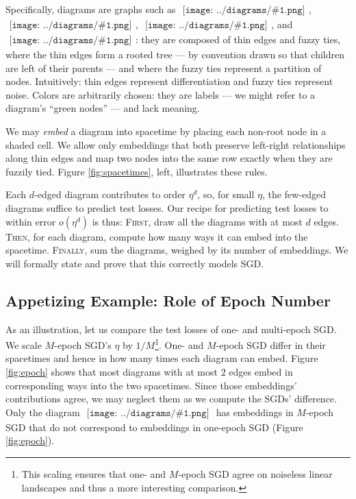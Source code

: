 \documentclass{article}
\theoremstyle{plain}
\theoremstyle{definition}
\newcommand{\sdia}[1]{\begin{gathered}\texttt{[image: ../diagrams/\#1.png]}\end{gathered}}
\begin{document}
            Specifically, diagrams are graphs such as $\sdia{(0-1)(01)}$,
            $\sdia{(01-2)(02-12)}$, $\sdia{(01-2)(01-12)}$, and
            $\sdia{(0-123)(02-12-23)}$: they are composed of thin edges and
            fuzzy ties, where the thin edges form a rooted tree --- by
            convention drawn so that children are left of their parents --- and
            where the fuzzy ties represent a partition of nodes.
            Intuitively: thin edges represent differentiation and fuzzy
            ties represent noise.
            {\color{moor}
            Colors} are arbitrarily chosen: they are labels --- we might refer
            to a diagram's ``green nodes'' --- and lack meaning.

            We may \emph{embed} a diagram into spacetime by placing each
            non-root node in a shaded cell.  We allow only embeddings that both
            preserve left-right relationships along thin edges and map two
            nodes into the same row exactly when they are fuzzily tied.  Figure
            \ref{fig:spacetimes}, left, illustrates these rules.

            Each $d$-edged diagram contributes to order $\eta^d$, so, for small
            $\eta$, the few-edged diagrams suffice to predict test losses.  Our
            recipe for predicting test losses to within error $o(\eta^d)$ is
            thus: \textsc{First}, draw all the diagrams with at most $d$ edges.
            \textsc{Then}, for each diagram, compute how many ways it can
            embed into the spacetime.  \textsc{Finally}, sum the diagrams,
            weighed by its number of embeddings.  We will formally state and
            prove that this correctly models SGD. 


    \subsection{Appetizing Example: Role of Epoch Number}
            As an illustration, let us compare the test losses of one- and
            multi-epoch SGD.  We scale $M$-epoch SGD's $\eta$ by
            $1/M$\footnote{
                This scaling ensures that one- and $M$-epoch SGD
                agree on noiseless linear landscapes and thus a 
                more interesting comparison.
            }.
            One- and $M$-epoch SGD differ in their spacetimes and hence in how
            many times each diagram can embed.  Figure \ref{fig:epoch} shows
            that most diagrams with at most $2$ edges embed in corresponding
            ways into the two spacetimes.  Since those embeddings'
            contributions agree, we may neglect them as we compute the SGDs'
            difference.  Only the diagram
            $\sdia{c(01-2)(01-12)}$ has embeddings in $M$-epoch SGD that do not
            correspond to embeddings in one-epoch SGD (Figure \ref{fig:epoch}). 
\end{document}
